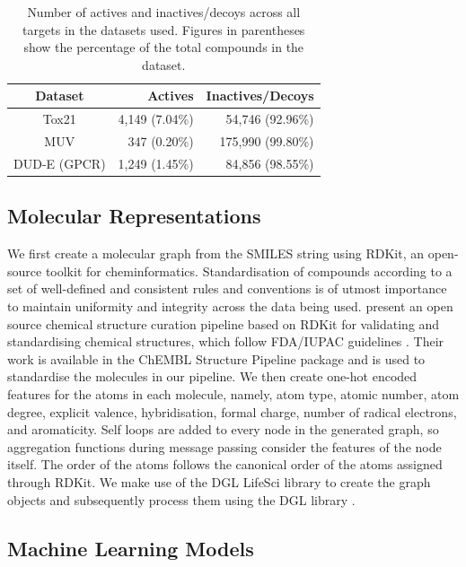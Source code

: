 \begin{table}[h]
	\centering
	\caption{Number of actives and inactives/decoys across all targets in the datasets used. Figures in parentheses show the percentage of the total compounds in the dataset.}
	\begin{tabular}{@{}crr@{}}
		\hline
		Dataset & Actives & Inactives/Decoys \\
		\hline
		Tox21 & 4,149 (7.04\%) & 54,746 (92.96\%) \\
		\hline
		MUV & 347 (0.20\%) & 175,990 (99.80\%) \\
		\hline
		DUD-E (GPCR) & 1,249 (1.45\%) & 84,856 (98.55\%) \\
	\end{tabular}
	\label{table:datasetimbalance}
\end{table}

\subsection{Molecular Representations}

We first create a molecular graph from the SMILES string using RDKit, an open-source toolkit for cheminformatics. Standardisation of compounds according to a set of well-defined and consistent rules and conventions is of utmost importance to maintain uniformity and integrity across the data being used. \citet{bento2020open} present an open source chemical structure curation pipeline based on RDKit for validating and standardising chemical structures, which follow FDA/IUPAC guidelines \citep{brecher2006graphical, food2007substance}. Their work is available in the ChEMBL Structure Pipeline package \cite{bento2020open} and is used to standardise the molecules in our pipeline. We then create one-hot encoded features for the atoms in each molecule, namely, atom type, atomic number, atom degree, explicit valence, hybridisation, formal charge, number of radical electrons, and aromaticity. Self loops are added to every node in the generated graph, so aggregation functions during message passing consider the features of the node itself. The order of the atoms follows the canonical order of the atoms assigned through RDKit. We make use of the DGL LifeSci \cite{dgllife} library to create the graph objects and subsequently process them using the DGL library \cite{wang2019dgl}.


\subsection{Machine Learning Models}

